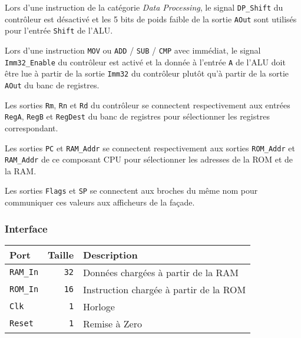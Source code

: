\documentclass{article}
\begin{document}
    Lors d'une instruction de la catégorie \textit{Data Processing}, le signal \texttt{DP\_Shift} du contrôleur est désactivé et les 5 bits de poids faible de la sortie \texttt{AOut} sont utilisés pour l'entrée \texttt{Shift} de l'ALU.

    Lors d'une instruction \texttt{MOV} ou \texttt{ADD} / \texttt{SUB} / \texttt{CMP} avec immédiat, le signal \texttt{Imm32\_Enable} du contrôleur est activé
    et la donnée à l'entrée \texttt{A} de l'ALU doit être lue à partir de la sortie \texttt{Imm32} du contrôleur plutôt qu'à partir de la sortie \texttt{AOut} du banc de registres.

    Les sorties \texttt{Rm}, \texttt{Rn} et \texttt{Rd} du contrôleur se connectent respectivement aux entrées \texttt{RegA}, \texttt{RegB} et \texttt{RegDest} du banc de registres pour sélectionner les registres correspondant.

    Les sorties \texttt{PC} et \texttt{RAM\_Addr} se connectent respectivement aux sorties \texttt{ROM\_Addr} et \texttt{RAM\_Addr} de ce composant CPU pour sélectionner les adresses de la ROM et de la RAM.

    Les sorties \texttt{Flags} et \texttt{SP} se connectent aux broches du même nom pour communiquer ces valeurs aux afficheurs de la façade.

    \subsubsection{Interface}


    \begin{tabular}{|l|r|l|}
        \hline
        \textbf{Port}    & \textbf{Taille} & \textbf{Description}                   \\
        \hline

        \texttt{RAM\_In} & \texttt{32}     & Données chargées à partir de la RAM    \\
        \hline
        \texttt{ROM\_In} & \texttt{16}     & Instruction chargée à partir de la ROM \\
        \hline
        \texttt{Clk}     & \texttt{1}      & Horloge                                \\
        \hline
        \texttt{Reset}   & \texttt{1}      & Remise à Zero                          \\


        \hline
    \end{tabular}
\end{document}
